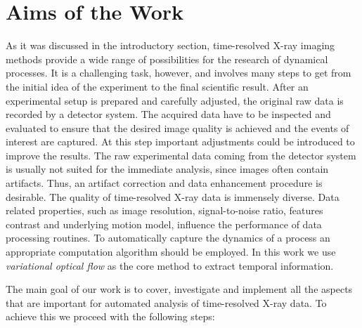 \section{Aims of the Work}

As it was discussed in the introductory section, time-resolved X-ray imaging methods provide a wide range of possibilities for the research of dynamical processes. 
It is a challenging task, however, and involves many steps to get from the initial idea of the experiment to the final scientific result. 
After an experimental setup is prepared and carefully adjusted, the original raw data is recorded by a detector system.  The acquired data have to be inspected and evaluated to ensure that the desired image quality is achieved and the events of interest are captured.
At this step important adjustments could be introduced to improve the results. The raw experimental data coming from the detector system is usually not suited for the immediate analysis, since images often contain artifacts.  Thus, an artifact correction and data enhancement procedure is desirable. The quality of time-resolved X-ray data is immensely diverse. Data related properties, such as image resolution, signal-to-noise ratio, features contrast and underlying motion model, influence the performance of data processing routines. To automatically capture the dynamics of a process an appropriate computation algorithm should be employed.  In this work we use \textit{variational optical flow} as the core method to extract temporal information. 
      
The main goal of our work is to cover, investigate and implement all the aspects that are important for automated analysis of time-resolved X-ray data. To achieve this we proceed with the following steps:
        
